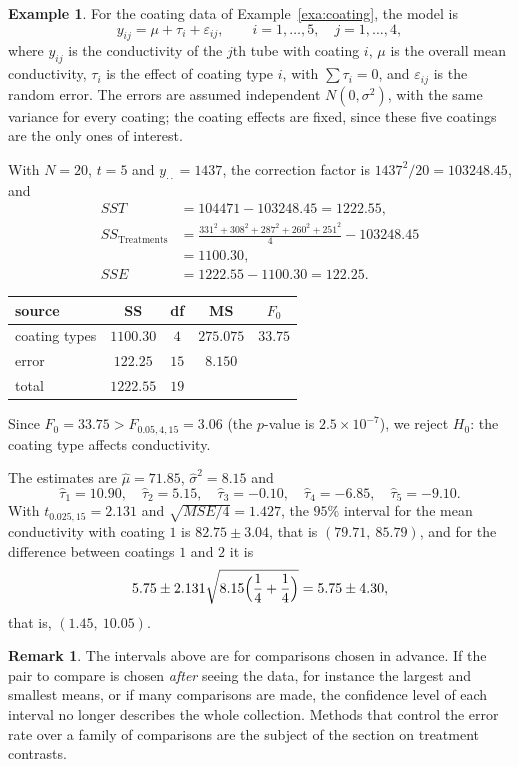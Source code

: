 \documentclass[11pt,a4paper]{article}
\numberwithin{equation}{section}
\theoremstyle{definition}
\newtheorem{exa}[thm]{Example}
\newtheorem*{remark}{Remark}
\begin{document}
\begin{exa}\label{exa:coating-anova}
For the coating data of Example~\ref{exa:coating}, the model is
\[
y_{ij} = \mu + \tau_i + \varepsilon_{ij} , \qquad i = 1, \dots, 5 , \quad j = 1, \dots, 4 ,
\]
where $y_{ij}$ is the conductivity of the $j$th tube with coating $i$, $\mu$ is the overall mean conductivity, $\tau_i$ is the effect of coating type $i$, with
$\sum\tau_i = 0$, and $\varepsilon_{ij}$ is the random error. The errors are assumed independent $N(0, \sigma^2)$, with the same variance for every coating; the
coating effects are fixed, since these five coatings are the only ones of interest.

With $N = 20$, $t = 5$ and $y_{\cdot\cdot} = 1437$, the correction factor is $1437^2/20 = 103248.45$, and
\begin{align*}
SST &= 104471 - 103248.45 = 1222.55 , \\
SS_{\mathrm{Treatments}} &= \frac{331^2 + 308^2 + 287^2 + 260^2 + 251^2}{4} - 103248.45 \\
&= 1100.30 , \\
SSE &= 1222.55 - 1100.30 = 122.25 .
\end{align*}
\begin{center}
\begin{tabular}{l|c|c|c|c}
source & SS & df & MS & $F_0$ \\
\hline
coating types & $1100.30$ & $4$ & $275.075$ & $33.75$ \\
error & $122.25$ & $15$ & $8.150$ & \\
\hline
total & $1222.55$ & $19$ & &
\end{tabular}
\end{center}
Since $F_0 = 33.75 > F_{0.05,4,15} = 3.06$ (the $p$-value is $2.5 \times 10^{-7}$), we reject $H_0$: the coating type affects conductivity.

The estimates are $\hat\mu = 71.85$, $\hat\sigma^2 = 8.15$ and
\[
\hat\tau_1 = 10.90 , \quad \hat\tau_2 = 5.15 , \quad \hat\tau_3 = -0.10 , \quad \hat\tau_4 = -6.85 , \quad \hat\tau_5 = -9.10 .
\]
With $t_{0.025,15} = 2.131$ and $\sqrt{MSE/4} = 1.427$, the $95\%$ interval for the mean conductivity with coating $1$ is $82.75 \pm 3.04$, that is $(79.71,\ 85.79)$,
and for the difference between coatings $1$ and $2$ it is
\[
5.75 \pm 2.131\sqrt{8.15\Bigl(\frac14 + \frac14\Bigr)} = 5.75 \pm 4.30 ,
\]
that is, $(1.45,\ 10.05)$.
\end{exa}

\begin{remark}
The intervals above are for comparisons chosen in advance. If the pair to compare is chosen \emph{after} seeing the data, for instance the largest
and smallest means, or if many comparisons are made, the confidence level of each interval no longer describes the whole collection. Methods
that control the error rate over a family of comparisons are the subject of the section on treatment contrasts.
\end{remark}
\end{document}
